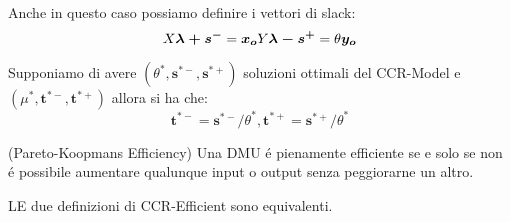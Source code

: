 \begin{oss}
Anche in questo caso possiamo definire i vettori di slack:
\begin{equation}
X\boldsymbol{\lambda + s^{-}} = \boldsymbol{x_o} \\
Y\boldsymbol{\lambda - s^{+}} = \theta\boldsymbol{y_o} 
\end{equation}
\end{oss}
\begin{oss} Supponiamo di avere $(\theta^{*}, \boldsymbol{s^{*-}}, \boldsymbol{s^{*+}})$ soluzioni ottimali del CCR-Model e $(\mu^{*}, \boldsymbol{t^{*-}}, \boldsymbol{t^{*+}})$ allora si ha che:
\begin{equation}
\boldsymbol{t^{*-}} = \boldsymbol{s^{*-}} / \theta^{*}, 
\boldsymbol{t^{*+}} = \boldsymbol{s^{*+}} / \theta^{*}
\end{equation}
\end{oss}
\begin{definiz} (Pareto-Koopmans Efficiency) Una DMU \'e pienamente efficiente se e solo se non \'e possibile aumentare qualunque input o output senza peggiorarne un altro.
\end{definiz} 
\begin{teor} LE due definizioni di CCR-Efficient sono equivalenti.
\end{teor}
